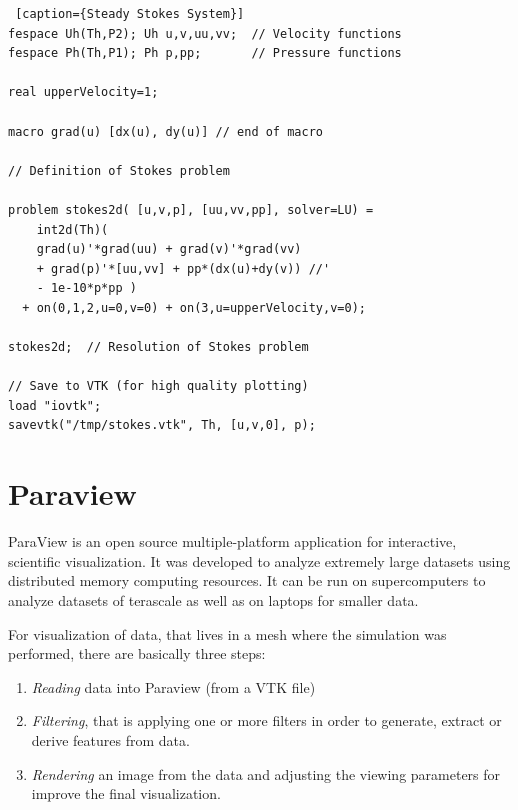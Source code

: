 \documentclass[12pt]{article}
\begin{document}
\begin{lstlisting} [caption={Steady Stokes System}]
fespace Uh(Th,P2); Uh u,v,uu,vv;  // Velocity functions
fespace Ph(Th,P1); Ph p,pp;       // Pressure functions

real upperVelocity=1;

macro grad(u) [dx(u), dy(u)] // end of macro

// Definition of Stokes problem

problem stokes2d( [u,v,p], [uu,vv,pp], solver=LU) =
    int2d(Th)(
	grad(u)'*grad(uu) + grad(v)'*grad(vv)
	+ grad(p)'*[uu,vv] + pp*(dx(u)+dy(v)) //'
	- 1e-10*p*pp )
  + on(0,1,2,u=0,v=0) + on(3,u=upperVelocity,v=0);

stokes2d;  // Resolution of Stokes problem

// Save to VTK (for high quality plotting)
load "iovtk";
savevtk("/tmp/stokes.vtk", Th, [u,v,0], p);
\end{lstlisting}


\section{Paraview}
\label{sec:brief-intro-paraview}

ParaView is an open source multiple-platform application for
interactive, scientific visualization. It was developed to analyze
extremely large datasets using distributed memory computing
resources. It can be run on supercomputers to analyze datasets of
terascale as well as on laptops for smaller data.

For visualization of data, that lives in a mesh where the simulation
was performed, there are basically three steps:
\begin{enumerate}
\item \textit{Reading} data into Paraview (from a VTK file)
\item \textit{Filtering}, that is applying one or more filters in order to
  generate, extract or derive features from data.
\item \textit{Rendering} an image from the data and adjusting the
  viewing parameters for improve the final visualization.
\end{enumerate}
\end{document}
